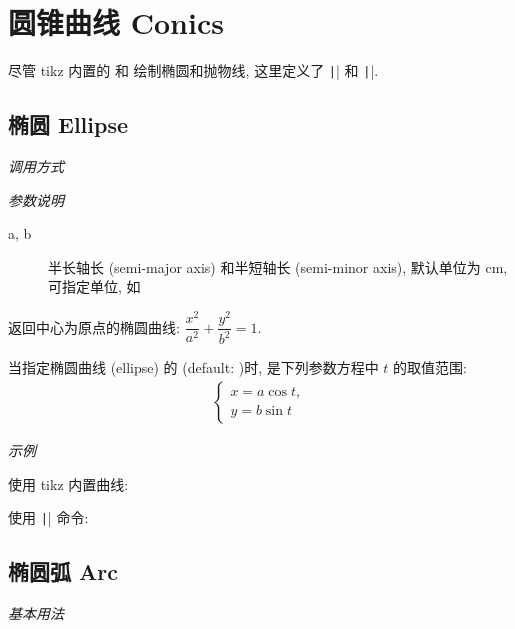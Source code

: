 \chapter{圆锥曲线 Conics}

尽管 tikz 内置的  和  绘制椭圆和抛物线,
这里定义了 \texttt|\ellipse| 和 \texttt|\parabola|.

\section{椭圆 Ellipse}

\emph{调用方式}

\begin{tcolorbox}{}
\end{tcolorbox}

\emph{参数说明}

\begin{description}
  \item[a, b] 半长轴长 (semi-major axis) 和半短轴长 (semi-minor axis), 默认单位为 cm, 可指定单位, 如 \verbum{(4cm, 3cm)}
\end{description}

返回中心为原点的椭圆曲线: $\dfrac{x^2}{a^2}+\dfrac{y^2}{b^2}=1$.

\begin{remark*}
当指定椭圆曲线 (ellipse) 的  (default: )时,  是下列参数方程中 $t$ 的取值范围:
\begin{align*}
  \begin{cases}
  x = a \cos t,\\y = b \sin t
  \end{cases}
\end{align*}
\end{remark*}

\emph{示例}

使用 tikz 内置曲线:


使用 \texttt|\ellipse| 命令:


\section{椭圆弧 Arc}

\emph{基本用法}


